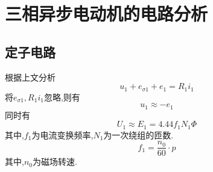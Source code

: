 \section{\K 三相异步电动机的电路分析}
\subsection{\K 定子电路}
根据上文分析
\begin{equation*}
    u_1+e_{\sigma 1}+e_1=R_1i_1
\end{equation*}
将$e_{\sigma 1},R_1i_1$忽略,则有
\begin{equation*}
    u_1\approx -e_1
\end{equation*}
同时有
\begin{equation*}
    U_1\approx E_1=4.44f_1N_1\varPhi 
\end{equation*}
其中,$f_1$为电流变换频率,$N_1$为一次绕组的匝数.
\begin{equation*}
    f_1=\frac{n_0}{60}\cdot p
\end{equation*}
其中,$n_0$为磁场转速.

